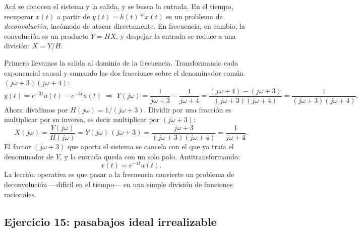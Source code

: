 \documentclass[10pt,a4paper]{article}
\begin{document}
	Acá se conocen el sistema y la salida, y se busca la entrada. En el tiempo, recuperar $x(t)$ a partir de $y(t)=h(t)*x(t)$ es un problema de \emph{deconvolución}, incómodo de atacar directamente. En frecuencia, en cambio, la convolución es un producto $Y=HX$, y despejar la entrada se reduce a una división: $X=Y/H$.

	Primero llevamos la salida al dominio de la frecuencia. Transformando cada exponencial causal y sumando las dos fracciones sobre el denominador común $(j\omega+3)(j\omega+4)$:
	\[
		y(t)=e^{-3t}u(t)-e^{-4t}u(t)
		\;\Rightarrow\;
		Y(j\omega)=\frac{1}{j\omega+3}-\frac{1}{j\omega+4}
		=\frac{(j\omega+4)-(j\omega+3)}{(j\omega+3)(j\omega+4)}
		=\frac{1}{(j\omega+3)(j\omega+4)}.
	\]
	Ahora dividimos por $H(j\omega)=1/(j\omega+3)$. Dividir por una fracción es multiplicar por su inversa, es decir multiplicar por $(j\omega+3)$:
	\[
		X(j\omega)=\frac{Y(j\omega)}{H(j\omega)}=Y(j\omega)\,(j\omega+3)
		=\frac{j\omega+3}{(j\omega+3)(j\omega+4)}
		=\frac{1}{j\omega+4}.
	\]
	El factor $(j\omega+3)$ que aporta el sistema se cancela con el que ya traía el denominador de $Y$, y la entrada queda con un solo polo. Antitransformando:
	\[
		\boxed{x(t)=e^{-4t}u(t).}
	\]
	La lección operativa es que pasar a la frecuencia convierte un problema de deconvolución ---difícil en el tiempo--- en una simple división de funciones racionales.

	\subsection*{Ejercicio 15: pasabajos ideal irrealizable}
\end{document}
